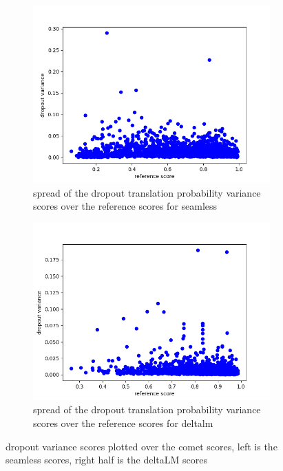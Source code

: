 \begin{figure}[ht]
        \centering%
        \begin{subfigure}{0.4\linewidth}
        \includegraphics[width=\textwidth]{Latex/sections/images/seamlessdropoutvariance.png}
        \caption{spread of the dropout translation probability variance scores over the reference scores for seamless}
    \end{subfigure}
    \begin{subfigure}{0.4\linewidth}
        \includegraphics[width=\textwidth]{Latex/sections/images/dlmdropoutvariance.png}
        \caption{spread of the dropout translation probability variance scores over the reference scores for deltalm}
    \end{subfigure}
        \caption{dropout variance scores plotted over the comet scores, left is the seamless scores, right half is the deltaLM scores}
        \label{fig:dropout translation variance score}
\end{figure}
    
